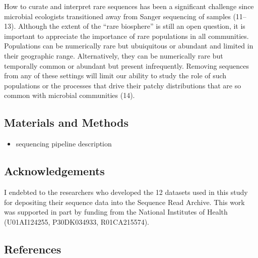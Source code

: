 \documentclass[
]{article}
\providecommand{\tightlist}{%
  \setlength{\itemsep}{0pt}\setlength{\parskip}{0pt}}
\begin{document}
How to curate and interpret rare sequences has been a significant
challenge since microbial ecologists transitioned away from Sanger
sequencing of samples (11--13). Although the extent of the ``rare
biosphere'' is still an open question, it is important to appreciate the
importance of rare populations in all communities. Populations can be
numerically rare but ubuiquitous or abundant and limited in their
geographic range. Alternatively, they can be numerically rare but
temporally common or abundant but present infrequently. Removing
sequences from any of these settings will limit our ability to study the
role of such populations or the processes that drive their patchy
distributions that are so common with microbial communities (14).

\hypertarget{materials-and-methods}{%
\subsection{Materials and Methods}\label{materials-and-methods}}

\begin{itemize}
\tightlist
\item
  sequencing pipeline description
\end{itemize}

\hypertarget{acknowledgements}{%
\subsection{Acknowledgements}\label{acknowledgements}}

I endebted to the researchers who developed the 12 datasets used in this
study for depositing their sequence data into the Sequence Read Archive.
This work was supported in part by funding from the National Institutes
of Health (U01AI124255, P30DK034933, R01CA215574).

\newpage

\hypertarget{references}{%
\subsection{References}\label{references}}
\end{document}
